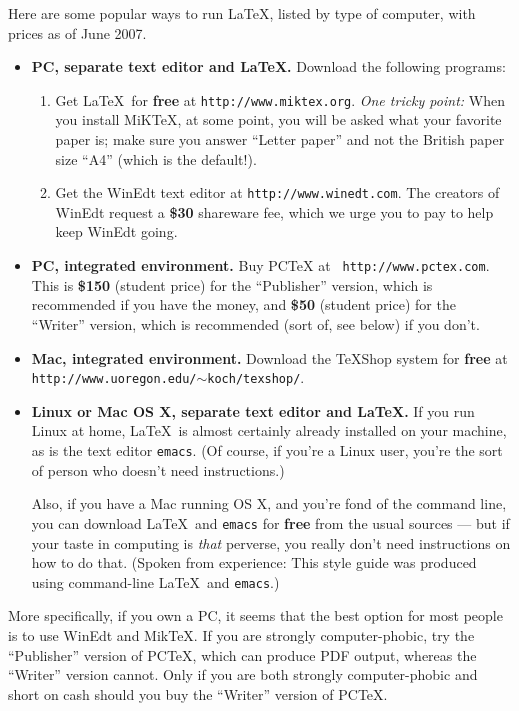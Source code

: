 \documentclass[modernstyle,12pt]{sjsuthesis}
\theoremstyle{definition}
\begin{document}
Here are some popular ways to run \LaTeX, listed by type of computer,
with prices as of June 2007.

\begin{itemize}
\item {\bf PC, separate text editor and \LaTeX.}  Download the
  following programs:
  \begin{enumerate}
  \item Get \LaTeX\ for {\bf free\/} at {\tt http://www.miktex.org}.
    {\it One tricky point:\/} When you install MiKTeX, at some point,
    you will be asked what your favorite paper is; make sure you
    answer ``Letter paper'' and not the British paper size ``A4''
    (which is the default!).
  \item Get the WinEdt text editor at {\tt http://www.winedt.com}.
    The creators of WinEdt request a {\bf \$30\/} shareware fee, which
    we urge you to pay to help keep WinEdt going.
  \end{enumerate}

\item {\bf PC, integrated environment.}  Buy PCTeX at {\tt
    http://www.pctex.com}.  This is {\bf \$150\/} (student price) for
  the ``Publisher'' version, which is recommended if you have the
  money, and {\bf \$50\/} (student price) for the ``Writer'' version,
  which is recommended (sort of, see below) if you don't.

\item {\bf Mac, integrated environment.} Download the TeXShop system
  for {\bf free\/} at {\tt
    http://www.uoregon.edu/$\sim$koch/texshop/}.

\item {\bf Linux or Mac OS X, separate text editor and \LaTeX.}  If
  you run Linux at home, \LaTeX\ is almost certainly already installed
  on your machine, as is the text editor {\tt emacs}.  (Of course, if
  you're a Linux user, you're the sort of person who doesn't need
  instructions.)

  Also, if you have a Mac running OS X, and you're fond of the command
  line, you can download \LaTeX\ and {\tt emacs\/} for {\bf free\/}
  from the usual sources --- but if your taste in computing is {\it
    that\/} perverse, you really don't need instructions on how to do
  that.  (Spoken from experience: This style guide was produced using
  command-line \LaTeX\ and {\tt emacs}.)
\end{itemize}

More specifically, if you own a PC, it seems that the best option for
most people is to use WinEdt and MikTeX.  If you are strongly
computer-phobic, try the ``Publisher'' version of PCTeX, which can
produce PDF output, whereas the ``Writer'' version cannot.  Only if
you are both strongly computer-phobic and short on cash should you buy
the ``Writer'' version of PCTeX.
\end{document}
